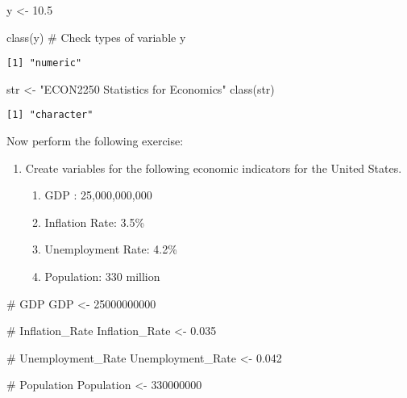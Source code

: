 \documentclass[
  letterpaper,
  DIV=11,
  numbers=noendperiod]{scrartcl}
\newenvironment{Shaded}{\begin{snugshade}}{\end{snugshade}}
\newcommand{\CommentTok}[1]{\textcolor[rgb]{0.37,0.37,0.37}{#1}}
\newcommand{\DecValTok}[1]{\textcolor[rgb]{0.68,0.00,0.00}{#1}}
\newcommand{\FloatTok}[1]{\textcolor[rgb]{0.68,0.00,0.00}{#1}}
\newcommand{\FunctionTok}[1]{\textcolor[rgb]{0.28,0.35,0.67}{#1}}
\newcommand{\NormalTok}[1]{\textcolor[rgb]{0.00,0.23,0.31}{#1}}
\newcommand{\OtherTok}[1]{\textcolor[rgb]{0.00,0.23,0.31}{#1}}
\newcommand{\StringTok}[1]{\textcolor[rgb]{0.13,0.47,0.30}{#1}}
\providecommand{\tightlist}{%
  \setlength{\itemsep}{0pt}\setlength{\parskip}{0pt}}\usepackage{longtable,booktabs,array}
\begin{document}
\begin{Shaded}
\begin{Highlighting}[]
\NormalTok{y }\OtherTok{\textless{}{-}} \FloatTok{10.5}

\FunctionTok{class}\NormalTok{(y) }\CommentTok{\# Check types of variable y}
\end{Highlighting}
\end{Shaded}

\begin{verbatim}
[1] "numeric"
\end{verbatim}

\begin{Shaded}
\begin{Highlighting}[]
\NormalTok{str }\OtherTok{\textless{}{-}} \StringTok{"ECON2250 Statistics for Economics"}
\FunctionTok{class}\NormalTok{(str)}
\end{Highlighting}
\end{Shaded}

\begin{verbatim}
[1] "character"
\end{verbatim}

Now perform the following exercise:

\begin{enumerate}
\def\labelenumi{\arabic{enumi}.}
\tightlist
\item
  Create variables for the following economic indicators for the United
  States.

  \begin{enumerate}
  \def\labelenumii{\alph{enumii}.}
  \tightlist
  \item
    GDP : 25,000,000,000
  \item
    Inflation Rate: 3.5\%
  \item
    Unemployment Rate: 4.2\%
  \item
    Population: 330 million
  \end{enumerate}
\end{enumerate}

\begin{Shaded}
\begin{Highlighting}[]
\CommentTok{\# GDP}
\NormalTok{GDP }\OtherTok{\textless{}{-}} \DecValTok{25000000000}
    
\CommentTok{\# Inflation\_Rate}
\NormalTok{Inflation\_Rate }\OtherTok{\textless{}{-}} \FloatTok{0.035}
    
\CommentTok{\# Unemployment\_Rate}
\NormalTok{Unemployment\_Rate }\OtherTok{\textless{}{-}} \FloatTok{0.042}

\CommentTok{\# Population}
\NormalTok{Population }\OtherTok{\textless{}{-}} \DecValTok{330000000}
\end{Highlighting}
\end{Shaded}
\end{document}
